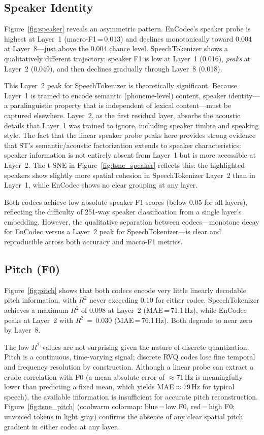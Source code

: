 \documentclass[10pt,twocolumn]{article}
\begin{document}
\subsection{Speaker Identity}

Figure~\ref{fig:speaker} reveals an asymmetric pattern. EnCodec's
speaker probe is highest at Layer~1 (macro-F1\,=\,0.013) and declines
monotonically toward 0.004 at Layer~8---just above the 0.004 chance
level. SpeechTokenizer shows a qualitatively different trajectory:
speaker F1 is low at Layer~1 (0.016), \emph{peaks} at Layer~2
(0.049), and then declines gradually through Layer~8 (0.018).

This Layer~2 peak for SpeechTokenizer is theoretically significant.
Because Layer~1 is trained to encode semantic (phoneme-level) content,
speaker identity---a paralinguistic property that is independent of
lexical content---must be captured elsewhere. Layer~2, as the first
residual layer, absorbs the acoustic details that Layer~1 was trained
to ignore, including speaker timbre and speaking style. The fact that
the linear speaker probe peaks here provides strong evidence that ST's
semantic/acoustic factorization extends to speaker characteristics:
speaker information is not entirely absent from Layer~1 but is more
accessible at Layer~2. The t-SNE in Figure~\ref{fig:tsne_speaker}
reflects this: the highlighted speakers show slightly more spatial
cohesion in SpeechTokenizer Layer~2 than in Layer~1, while EnCodec
shows no clear grouping at any layer.

Both codecs achieve low absolute speaker F1 scores (below 0.05 for
all layers), reflecting the difficulty of 251-way speaker
classification from a single layer's embedding. However, the
qualitative separation between codecs---monotone decay for EnCodec
versus a Layer~2 peak for SpeechTokenizer---is clear and reproducible
across both accuracy and macro-F1 metrics.

\subsection{Pitch (F0)}

Figure~\ref{fig:pitch} shows that both codecs encode very little
linearly decodable pitch information, with $R^2$ never exceeding 0.10
for either codec. SpeechTokenizer achieves a maximum $R^2$ of 0.098 at
Layer~2 (MAE\,=\,71.1\,Hz), while EnCodec peaks at Layer~2 with
$R^2\,=\,0.030$ (MAE\,=\,76.1\,Hz). Both degrade to near zero by
Layer~8.

The low $R^2$ values are not surprising given the nature of discrete
quantization. Pitch is a continuous, time-varying signal; discrete RVQ
codes lose fine temporal and frequency resolution by construction.
Although a linear probe can extract a crude correlation with F0 (a mean
absolute error of $\approx$71\,Hz is meaningfully lower than predicting
a fixed mean, which yields MAE$\approx$79\,Hz for typical speech), the
available information is insufficient for accurate pitch reconstruction.
Figure~\ref{fig:tsne_pitch} (coolwarm colormap: blue\,=\,low F0,
red\,=\,high F0; unvoiced tokens in light gray) confirms the absence of
any clear spatial pitch gradient in either codec at any layer.
\end{document}
